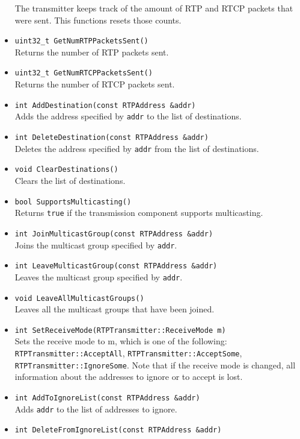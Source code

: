 \documentclass[12pt,a4paper]{article}
\begin{document}
\begin{itemize}
						The transmitter keeps track of the amount of RTP and RTCP 
						packets that were sent. This functions resets those counts.
					\item {\tt uint32\_t GetNumRTPPacketsSent()}\\
						Returns the number of RTP packets sent.
					\item {\tt uint32\_t GetNumRTCPPacketsSent()}\\
						Returns the number of RTCP packets sent.
					\item {\tt int AddDestination(const RTPAddress \&addr)}\\
						Adds the address specified by {\tt addr} to the list of
						destinations.
					\item {\tt int DeleteDestination(const RTPAddress \&addr)}\\
						Deletes the address specified by {\tt addr} from the list
						of destinations.
					\item {\tt void ClearDestinations()}\\
						Clears the list of destinations.
					\item {\tt bool SupportsMulticasting()}\\
						Returns {\tt true} if the transmission component supports
						multicasting.
					\item {\tt int JoinMulticastGroup(const RTPAddress \&addr)}\\
						Joins the multicast group specified by {\tt addr}.
					\item {\tt int LeaveMulticastGroup(const RTPAddress \&addr)}\\
						Leaves the multicast group specified by {\tt addr}.
					\item {\tt void LeaveAllMulticastGroups()}\\
						Leaves all the multicast groups that have been joined.
					\item {\tt int SetReceiveMode(RTPTransmitter::ReceiveMode m)}\\
						Sets the receive mode to m, which is one of the following:
						{\tt RTPTrans\-mitter::\-Accept\-All}, {\tt RTPTrans\-mitter::\-Accept\-Some},
						{\tt RTPTrans\-mitter::\-Ignore\-Some}. Note that if the receive
						mode is changed, all information about the addresses to ignore
						or to accept is lost.
					\item {\tt int AddToIgnoreList(const RTPAddress \&addr)}\\
						Adds {\tt addr} to the list of addresses to ignore.
					\item {\tt int DeleteFromIgnoreList(const RTPAddress \&addr)}\\

\end{itemize}
\end{document}
